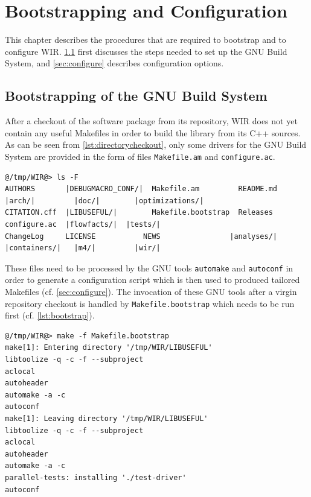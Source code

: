 \chapter{Bootstrapping and Configuration}
\label{chap:bootstrap}
\renewcommand{\sectiontitle}{}

This chapter describes the procedures that are required to bootstrap and to configure \gls{WIR}.
\cref{sec:bootstrap} first discusses the steps needed to set up the GNU Build System, and \cref{sec:configure} describes configuration options.


\section{Bootstrapping of the GNU Build System}
\label{sec:bootstrap}

After a checkout of the software package from its repository, \gls{WIR} does not yet contain any useful Makefiles in order to build the library from its C++ sources.
As can be seen from \cref{lst:directorycheckout}, only some drivers for the GNU Build System are provided in the form of files \texttt{Makefile.am} and \texttt{configure.ac}.

\begin{lstlisting}[style=commandline,float=h,caption={Directory Listing After Repository Checkout},label=lst:directorycheckout]
@/tmp/WIR@> ls -F
AUTHORS       |DEBUGMACRO_CONF/|  Makefile.am         README.md  |arch/|         |doc/|        |optimizations/|
CITATION.cff  |LIBUSEFUL/|        Makefile.bootstrap  Releases   configure.ac  |flowfacts/|  |tests/|
ChangeLog     LICENSE           NEWS                |analyses/|  |containers/|   |m4/|         |wir/|
\end{lstlisting}

These files need to be processed by the GNU tools \texttt{automake} and \texttt{autoconf} in order to generate a configuration script which is then used to produced tailored Makefiles (cf. \cref{sec:configure}).
The invocation of these GNU tools after a virgin repository checkout is handled by \texttt{Makefile.bootstrap} which needs to be run first (cf. \cref{lst:bootstrap}).

\begin{lstlisting}[style=commandline,float=h,caption={Execution of \texttt{Makefile.bootstrap}},label=lst:bootstrap]
@/tmp/WIR@> make -f Makefile.bootstrap
make[1]: Entering directory '/tmp/WIR/LIBUSEFUL'
libtoolize -q -c -f --subproject
aclocal
autoheader
automake -a -c
autoconf
make[1]: Leaving directory '/tmp/WIR/LIBUSEFUL'
libtoolize -q -c -f --subproject
aclocal
autoheader
automake -a -c
parallel-tests: installing './test-driver'
autoconf
\end{lstlisting}

